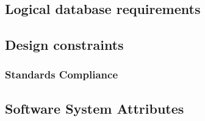 \subsection{Logical database requirements}


\subsection{Design constraints}


\subsubsection{Standards Compliance}


\subsection{Software System Attributes}

